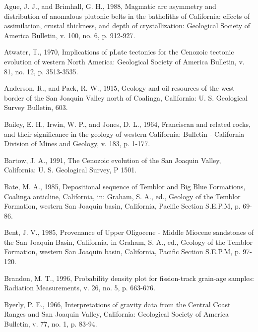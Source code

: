 \documentclass[11pt,twoside]{article}
\begin{document}
\begin{description}

\item Ague, J.  J., and Brimhall, G. H.,  1988, Magmatic arc asymmetry
and  distribution of  anomalous plutonic  belts in  the  batholiths of
California; effects  of assimilation, crustal thickness,  and depth of
crystallization:  Geological  Society  of  America Bulletin,  v.  100,
no. 6, p. 912-927.

\item  Atwater, T.,  1970,  Implications of  pLate  tectonics for  the
Cenozoic  tectonic  evolution  of  western North  America:  Geological
Society of America Bulletin, v. 81, no. 12, p. 3513-3535.

\item Anderson, R.,  and Pack, R. W., 1915,  Geology and oil resources
of  the west  border  of the  San  Joaquin Valley  north of  Coalinga,
California: U. S. Geological Survey Bulletin, 603.

\item Bailey, E. H., Irwin, W.  P., and Jones, D. L., 1964, Franciscan
and related  rocks, and their  significance in the geology  of western
California:  Bulletin  - California  Division  of  Mines and  Geology,
v. 183, p. 1-177.

\item Bartow, J.  A., 1991, The Cenozoic evolution  of the San Joaquin
Valley, California: U. S. Geological Survey, P 1501.

\item Bate, M. A., 1985, Depositional sequence of Temblor and Big Blue
Formations, Coalinga  anticline, California, in: Graham,  S.  A., ed.,
Geology  of   the  Temblor  Formation,  western   San  Joaquin  basin,
California, Pacific Section S.E.P.M, p. 69-86.

\item  Bent, J.  V.,  1985,  Provenance of  Upper  Oligocene -  Middle
Miocene sandstones  of the San  Joaquin Basin, California,  in Graham,
S.  A., ed.,  Geology of  the Temblor  Formation, western  San Joaquin
basin, California, Pacific Section S.E.P.M, p. 97-120.

\item Brandon, M. T., 1996, Probability density plot for fission-track
grain-age samples: Radiation Measurements, v. 26, no. 5, p. 663-676.

\item Byerly,  P. E., 1966,  Interpretations of gravity data  from the
Central Coast  Ranges and  San Joaquin Valley,  California: Geological
Society of America Bulletin, v. 77, no. 1, p. 83-94.


\end{description}
\end{document}

